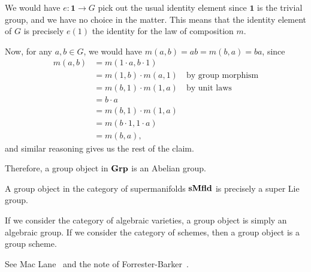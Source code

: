 \begin{node}
\begin{node}[Examples]
\begin{node}
We would have $e\colon\mathbf{1}\to G$ pick out the usual identity
element since $\mathbf{1}$ is the trivial group, and we have no choice
in the matter. This means that the identity element of $G$ is precisely
$e(1)$ the identity for the law of composition $m$.

Now, for any $a,b\in G$, we would have $m(a,b)=ab=m(b,a)=ba$, since
\begin{subequations}
\begin{align}
m(a,b) &= m(1\cdot a,b\cdot 1)\\
&=m(1,b)\cdot m(a,1)\quad\mbox{by group morphism}\\
&=m(b,1)\cdot m(1,a)\quad\mbox{by unit laws}\\
&=b\cdot a\\
&=m(b,1)\cdot m(1,a)\\
&=m(b\cdot 1,1\cdot a)\\
&=m(b,a),
\end{align}
\end{subequations}
and similar reasoning gives us the rest of the claim.

Therefore, a group object in $\mathbf{Grp}$ is an Abelian group.
\end{node}

\begin{node}\label{internal-000F}%
A group object in the category of supermanifolds $\mathbf{s}\mathbf{Mfld}$ is precisely a
super Lie group.
\end{node}

\begin{node}\label{internal-000G}%
If we consider the category of algebraic varieties, a group object is
simply an algebraic group. If we consider the category of schemes, then
a group object is a group scheme.
\end{node}
\end{node} %

\begin{node}[References]\label{internal-0008}%
See Mac Lane~\cite[III\S6]{mac1998categories} and
the note of Forrester-Barker~\cite{forresterbarker2002group}.
\end{node}
\end{node}

